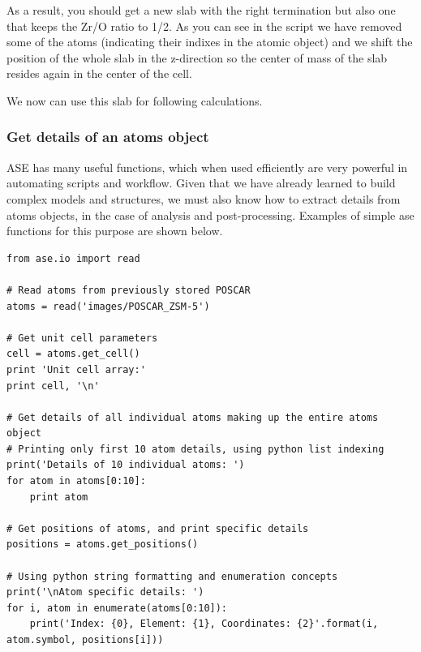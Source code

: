 \documentclass[11pt]{article}
\begin{document}
As a result, you should get a new slab with the right termination but also one that keeps the Zr/O ratio to 1/2. As you can see in the script we have removed some of the atoms (indicating their indixes in the atomic object) and we shift the position of the whole slab in the z-direction so the center of mass of the slab resides again in the center of the cell.

We now can use this slab for following calculations.  

\subsubsection{Get details of an atoms object}
\label{sec-2-3-6}
ASE has many useful functions, which when used efficiently are very powerful in automating scripts and workflow. Given that we have already learned to build complex models and structures, we must also know how to extract details from atoms objects, in the case of analysis and post-processing. Examples of simple ase functions for this purpose are shown below.
\begin{verbatim}
from ase.io import read

# Read atoms from previously stored POSCAR
atoms = read('images/POSCAR_ZSM-5')

# Get unit cell parameters
cell = atoms.get_cell()
print 'Unit cell array:' 
print cell, '\n'

# Get details of all individual atoms making up the entire atoms object
# Printing only first 10 atom details, using python list indexing
print('Details of 10 individual atoms: ')
for atom in atoms[0:10]:
    print atom

# Get positions of atoms, and print specific details
positions = atoms.get_positions()

# Using python string formatting and enumeration concepts
print('\nAtom specific details: ')
for i, atom in enumerate(atoms[0:10]):
    print('Index: {0}, Element: {1}, Coordinates: {2}'.format(i, atom.symbol, positions[i]))
\end{verbatim}
\end{document}
